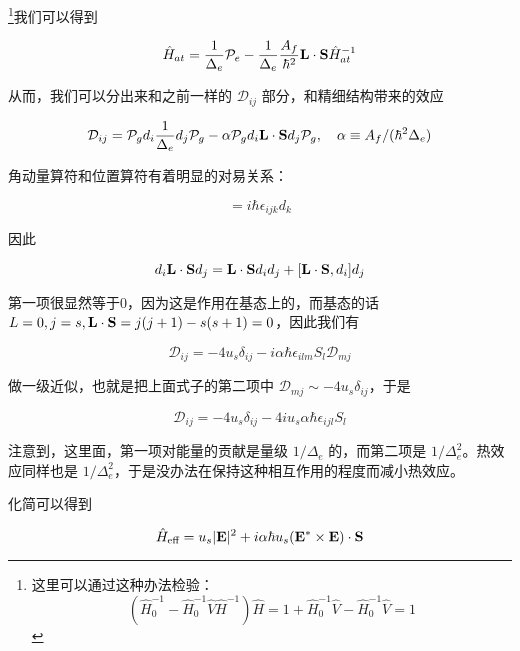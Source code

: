 \footnote{这里可以通过这种办法检验：
\begin{equation}
({\hat H}_0^{-1} - {\hat H}_0^{-1}\hat{V} {\hat H}^{-1}) \hat{H}  = 1 + {\hat H}_0^{-1} \hat{V} - {\hat H}_0^{-1}\hat{V} = 1
\end{equation}
}我们可以得到

\begin{equation}
\hat{H}_{at} = \frac{1}{\Delta_e}\mathcal{P}_e-\frac{1}{\Delta_e}\frac{A_f}{\hbar^2}{\bf L\cdot S}\hat{H}_{at}^{-1} 
\end{equation}

从而，我们可以分出来和之前一样的 $\mathcal{D}_{ij}$ 部分，和精细结构带来的效应

\begin{equation}
\mathcal{D}_{ij} = \mathcal{P}_g d_i \frac{1}{\Delta_e} d_j \mathcal{P}_g - \alpha \mathcal{P}_g d_i {\bf L\cdot S}d_j\mathcal{P}_g,\quad \alpha \equiv A_f/(\hbar^2\Delta_e)
\end{equation}

角动量算符和位置算符有着明显的对易关系：

\begin{equation}
[L_i,d_j] = i\hbar\epsilon_{ijk}d_k
\end{equation}

因此

\begin{equation}
d_i {\bf L\cdot S}d_j = {\bf L\cdot S}d_id_j + [{\bf L\cdot S}, d_i]d_j
\end{equation}

第一项很显然等于0，因为这是作用在基态上的，而基态的话 $L=0, j = s, {\bf L\cdot S} = j(j+1) - s(s+1) = 0$，因此我们有

\begin{equation}
\mathcal{D}_{ij} = -4u_s\delta_{ij} -i\alpha\hbar\epsilon_{ilm} S_l \mathcal{D}_{mj}
\end{equation}

做一级近似，也就是把上面式子的第二项中 $\mathcal{D}_{mj} \sim -4u_s\delta_{ij}$，于是

\begin{equation}
\mathcal{D}_{ij} = -4u_s\delta_{ij} - 4i u_s\alpha\hbar\epsilon_{ijl} S_l
\end{equation}

注意到，这里面，第一项对能量的贡献是量级 $1/\Delta_e$ 的，而第二项是 $1/\Delta_e^2$。热效应同样也是 $1/\Delta_e^2$，于是没办法在保持这种相互作用的程度而减小热效应。

化简可以得到

\begin{equation}
\hat{H}_{\text{eff}} = u_s|{\bf E}|^2 + i \alpha\hbar u_s ({\bf E^*\times E )\cdot S}
\end{equation}

